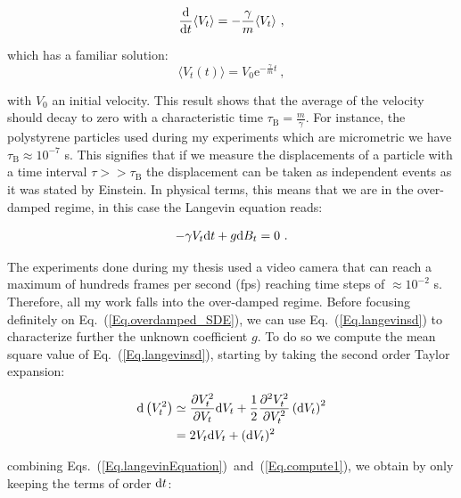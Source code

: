 \begin{equation}
	\frac{ \textnormal{d}}{\textnormal{d}t}\langle V_t \rangle = - \frac{\gamma}{m} \langle V_t \rangle ~,
\end{equation}

which has a familiar solution:
\begin{equation}
	\langle V_t (t) \rangle =   V_0 \mathrm{e}^{-\frac{\gamma}{m} t}~,
	\label{Eq.int_V_langevin}
\end{equation}

with $V_0$ an initial velocity. This result shows that the average of the velocity should decay to zero with a characteristic time $\tau_\mathrm{B} = \frac{m}{\gamma}$. For instance, the polystyrene particles used during my experiments which are micrometric we have $\tau_\mathrm{B} \approx 10^{-7}$ s. This signifies that if we measure the displacements of a particle with a time interval $ \tau  >> \tau _\mathrm{B} $ the displacement can be taken as independent events as it was stated by Einstein. In physical terms, this means that we are in the over-damped regime, in this case the Langevin equation reads:

\begin{equation}
-\gamma V_t \textnormal{d}t  + g  \textnormal{d}B_t = 0~.	
\label{Eq.overdamped_SDE}
\end{equation}

The experiments done during my thesis used a video camera that can reach a maximum of hundreds frames per second (\gls{fps}) reaching time steps of $\approx 10^{-2}$ s. Therefore, all my work falls into the over-damped regime. Before focusing definitely on Eq.~(\ref{Eq.overdamped_SDE}), we can use Eq.~(\ref{Eq.langevinsd}) to characterize further the unknown coefficient $g$. To do so we compute the mean square value of Eq.~(\ref{Eq.langevinsd}), starting by taking the second order Taylor expansion:


\begin{equation}
	\begin{aligned}
		\textnormal{d}\left(V_t^2\right) &\simeq \frac{\partial V_t ^ 2}{\partial V_t} \textnormal{d} V_t + \frac{1}{2} \frac{\partial ^2 V_t^2}{\partial V_t ^2} \left( \textnormal{d}V_t \right)^2  \\
		& = 2 V_t \textnormal{d}V_t + (\textnormal{d}V_t)^2 \\ 
	\end{aligned}
	\label{Eq.compute1}
\end{equation}

combining Eqs.~(\ref{Eq.langevinEquation})~and~(\ref{Eq.compute1}), we obtain by only keeping  the terms of order $\textnormal{d}t$:

